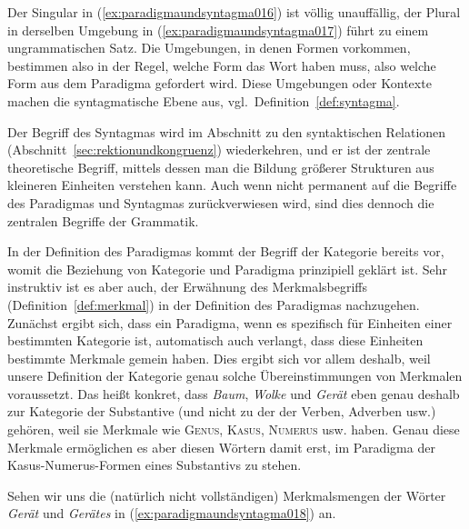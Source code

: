 Der Singular in (\ref{ex:paradigmaundsyntagma016}) ist völlig unauffällig, der Plural in derselben Umgebung in (\ref{ex:paradigmaundsyntagma017}) führt zu einem ungrammatischen Satz.
Die Umgebungen, in denen Formen vorkommen, bestimmen also in der Regel, welche Form das Wort haben muss, also welche Form aus dem Paradigma gefordert wird.
Diese Umgebungen oder Kontexte machen die syntagmatische Ebene aus, vgl.\ Definition~\ref{def:syntagma}.


Der Begriff des Syntagmas wird im Abschnitt zu den syntaktischen Relationen (Abschnitt~\ref{sec:rektionundkongruenz}) wiederkehren, und er ist der zentrale theoretische Begriff, mittels dessen man die Bildung größerer Strukturen aus kleineren Einheiten verstehen kann.
Auch wenn nicht permanent auf die Begriffe des Paradigmas und Syntagmas zurückverwiesen wird, sind dies dennoch die zentralen Begriffe der Grammatik.


In der Definition des Paradigmas kommt der Begriff der Kategorie bereits vor, womit die Beziehung von Kategorie und Paradigma prinzipiell geklärt ist.
Sehr instruktiv ist es aber auch, der Erwähnung des Merkmalsbegriffs (Definition~\ref{def:merkmal}) in der Definition des Paradigmas nachzugehen.
Zunächst ergibt sich, dass ein Paradigma, wenn es spezifisch für Einheiten einer bestimmten Kategorie ist, automatisch auch verlangt, dass diese Einheiten bestimmte Merkmale gemein haben.
Dies ergibt sich vor allem deshalb, weil unsere Definition der Kategorie genau solche Übereinstimmungen von Merkmalen voraussetzt.
Das heißt konkret, dass \zB \textit{Baum}, \textit{Wolke} und \textit{Gerät} eben genau deshalb zur Kategorie der Substantive (und nicht zu der der Verben, Adverben usw.) gehören, weil sie Merkmale wie \textsc{Genus}, \textsc{Kasus}, \textsc{Numerus} usw. haben.
Genau diese Merkmale ermöglichen es aber diesen Wörtern damit erst, im Paradigma der Kasus-Numerus-Formen eines Substantivs zu stehen.

Sehen wir uns die (natürlich nicht vollständigen) Merkmalsmengen der Wörter \textit{Gerät} und \textit{Gerätes} in (\ref{ex:paradigmaundsyntagma018}) an.

